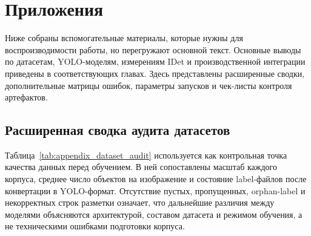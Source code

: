 \documentclass[12pt,a4paper,oneside,openany]{report}
\begin{document}

\clearpage
\appendix
\chapter*{Приложения}
 

\renewcommand{\thesection}{A.\arabic{section}}
\setcounter{section}{0}
\setcounter{table}{0}
\setcounter{figure}{0}
\setcounter{lstlisting}{0}
\renewcommand{\thetable}{A.\arabic{table}}
\renewcommand{\thefigure}{A.\arabic{figure}}
\renewcommand{\thelstlisting}{A.\arabic{lstlisting}}
\renewcommand{\theHsection}{appA.\arabic{section}}
\renewcommand{\theHtable}{appA.\arabic{table}}
\renewcommand{\theHfigure}{appA.\arabic{figure}}
\renewcommand{\theHlstlisting}{appA.\arabic{lstlisting}}


Ниже собраны вспомогательные материалы, которые нужны для воспроизводимости работы, но
перегружают основной текст. Основные выводы по датасетам, YOLO-моделям, измерениям IDet и
производственной интеграции приведены в соответствующих главах. Здесь представлены расширенные
сводки, дополнительные матрицы ошибок, параметры запусков и чек-листы контроля артефактов.


\FloatBarrier
\section{Расширенная сводка аудита датасетов}

Таблица~\ref{tab:appendix_dataset_audit} используется как контрольная точка качества данных перед
обучением. В ней сопоставлены масштаб каждого корпуса, среднее число объектов на изображение и
состояние label-файлов после конвертации в YOLO-формат. Отсутствие пустых, пропущенных,
orphan-label и некорректных строк разметки означает, что дальнейшие различия между моделями
объясняются архитектурой, составом датасета и режимом обучения, а не техническими ошибками
подготовки корпуса.
\end{document}
